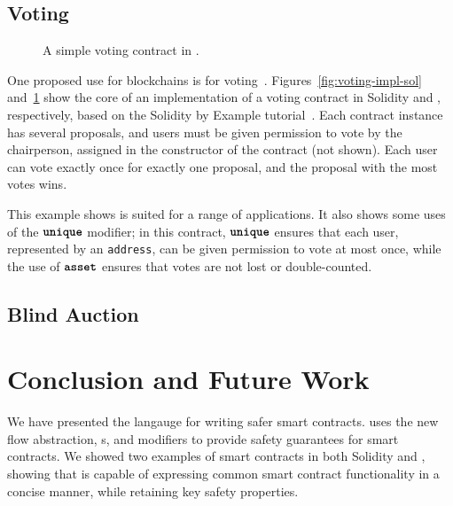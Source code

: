 \documentclass[nonacm, dvipsnames, sigconf]{acmart}
\begin{document}

\subsection{Voting}\label{sec:voting-impl}
\begin{figure}
    \centering
    
    \vspace{-1em}
    \caption{A simple voting contract in \langName.}
    \label{fig:voting-impl-flow}
\end{figure}
One proposed use for blockchains is for voting~\cite{Elsden18:Making}.
Figures~\ref{fig:voting-impl-sol} and~\ref{fig:voting-impl-flow} show the core of an implementation of a voting contract in Solidity and \langName, respectively, based on the Solidity by Example tutorial~\cite{solidityByExample}.
Each contract instance has several proposals, and users must be given permission to vote by the chairperson, assigned in the constructor of the contract (not shown).
Each user can vote exactly once for exactly one proposal, and the proposal with the most votes wins.

This example shows \langName is suited for a range of applications.
It also shows some uses of the $\textbf{\texttt{unique}}$ modifier; in this contract, $\textbf{\texttt{unique}}$ ensures that each user, represented by an \lstinline{address}, can be given permission to vote at most once, while the use of $\textbf{\texttt{asset}}$ ensures that votes are not lost or double-counted.


\subsection{Blind Auction}\label{sec:blind-auction-impl}
\begin{figure}
    \centering
    
    \vspace{-1em}
    \caption{}
    \label{fig:blind-auction-impl-flow}
\end{figure}

\section{Conclusion and Future Work}

We have presented the \langName langauge for writing safer smart contracts.
\langName uses the new flow abstraction, \assetTxt{}s, and modifiers to provide safety guarantees for smart contracts.
We showed two examples of smart contracts in both Solidity and \langName, showing that \langName is capable of expressing common smart contract functionality in a concise manner, while retaining key safety properties.
\end{document}
